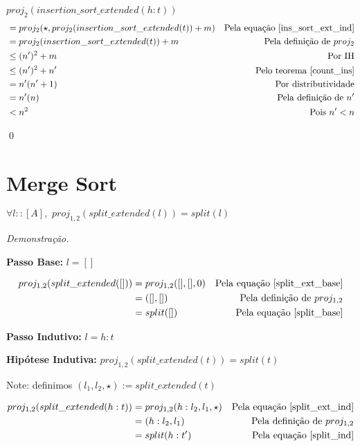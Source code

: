 \documentclass[12pt, oneside, a4paper,english,brazil]{abntex2}
\begin{document}
$proj_{2}(insertion\_sort\_extended(h : t))$
\begin{align*}
   &= proj_{2}(\star, proj_{2}(insertion\_sort\_extended(t)) + m) &\text{Pela equa\c{c}\~ao \ref{ins_sort_ext_ind}} \\
                                             &= proj_{2}(insertion\_sort\_extended(t)) + m &\text{Pela defini\c{c}\~ao de } proj_{2} \\
   &\le (n')^{2} + m &\text{Por IH} \\
   &\le (n')^{2} + n' &\text{Pelo teorema \ref{count_ins}} \\
   &=n'(n' + 1) &\text{Por distributividade} \\
   &=n'(n) &\text{Pela defini\c{c}\~ao de $n'$} \\
  &< n^{2} &\text{Pois $n' < n$}
\end{align*}

\qed

\section{Merge Sort}

\begin{teorema}\label{split_eq}
  $\forall l :: [A], \,\, proj_{1,2}(split\_extended(l)) = split(l)$
\end{teorema}

\noindent \textit{Demonstra\c{c}\~ao.}

\textbf{Passo Base: } $l = []$

\begin{align*}
  proj_{1,2}(split\_extended([])) &= proj_{1,2}([], [], 0) &\text{Pela equa\c{c}\~ao \ref{split_ext_base}} \\
                                &= ([],[]) &\text{Pela defini\c{c}\~ao de $proj_{1,2}$} \\
  &= split([]) &\text{Pela equa\c{c}\~ao \ref{split_base}}
\end{align*}

\textbf{Passo Indutivo: } $l = h : t$

\textbf{Hip\'otese Indutiva: } $proj_{1,2}(split\_extended(t)) = split(t)$

Note: definimos $(l_{1}, l_{2}, \star) := split\_extended(t)$

\begin{align*}
  proj_{1,2}(split\_extended(h : t)) &= proj_{1,2}(h : l_{2}, l_{1}, \star) &\text{Pela equa\c{c}\~ao \ref{split_ext_ind}} \\
                                     &= (h : l_{2}, l_{1}) &\text{Pela defini\c{c}\~ao de $proj_{1,2}$} \\
  &= split(h : t') &\text{Pela equa\c{c}\~ao \ref{split_ind}}
\end{align*}
\end{document}
